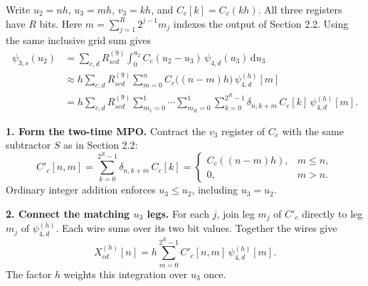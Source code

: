 \documentclass[11pt,a4paper]{article}
\newcommand{\subhead}[1]{\par\Needspace{4\baselineskip}\smallskip{\large\sffamily\bfseries\color{DeepBlue}#1\par}}
\begin{document}
\subhead{2.3\quad Express \(\psi_{3,s}(u_2)\) in terms of \(\psi_{4,d}(u_3)\)}
Write \(u_2=nh\), \(u_3=mh\), \(v_3=kh\), and \(C_c[k]=C_c(kh)\).
All three registers have \(R\) bits. Here \(m=\sum_{j=1}^R2^{j-1}m_j\)
indexes the output of Section 2.2. Using the same inclusive grid sum gives
\[
\begin{aligned}
 \psi_{3,s}(u_2)
 &=\sum_{c,d}R^{(9)}_{scd}\int_0^{u_2}
 C_c(u_2-u_3)\,\psi_{4,d}(u_3)\,\mathrm{d}u_3\\
 &\approx h\sum_{c,d}R^{(9)}_{scd}\sum_{m=0}^{n}
 C_c\bigl((n-m)h\bigr)\,\psi_{4,d}^{(h)}[m]\\
 &= h\sum_{c,d}R^{(9)}_{scd}
 \sum_{m_1=0}^1\cdots\sum_{m_R=0}^1\sum_{k=0}^{2^R-1}
 \delta_{n,k+m}\,C_c[k]\,\psi_{4,d}^{(h)}[m].
\end{aligned}
\]

\textbf{1. Form the two-time MPO.}
Contract the \(v_3\) register of \(C_c\) with the same subtractor \(S\) as in Section 2.2:
\[
 C'_c[n,m]=\sum_{k=0}^{2^R-1}\delta_{n,k+m}\,C_c[k]
 =\begin{cases} C_c((n-m)h),&m\le n,\\0,&m>n.\end{cases}
\]
Ordinary integer addition enforces \(u_3\le u_2\), including \(u_3=u_2\).

\textbf{2. Connect the matching \(u_3\) legs.}
For each \(j\), join leg \(m_j\) of \(C'_c\) directly to leg \(m_j\) of
\(\psi_{4,d}^{(h)}\). Each wire sums over its two bit values. Together the wires give
\[
 X_{cd}^{(h)}[n]=h\sum_{m=0}^{2^R-1}C'_c[n,m]\,\psi_{4,d}^{(h)}[m].
\]
The factor \(h\) weights this integration over \(u_3\) once.

\begin{center}
\end{center}
\end{document}
